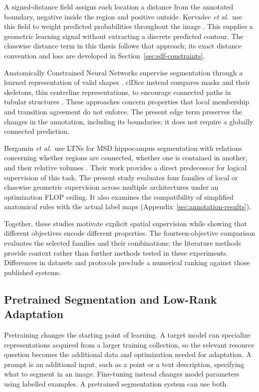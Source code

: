 \documentclass[12pt,a4paper]{article}
\begin{document}
A signed-distance field assigns each location a distance from the annotated
boundary, negative inside the region and positive outside. Kervadec \emph{et
al.}\ use this field to weight predicted probabilities throughout the image
\cite{kervadec2019boundary}. This supplies a geometric learning signal
without extracting a discrete predicted contour. The classwise distance term
in this thesis follows that approach; its exact distance convention and loss
are developed in Section~\ref{sec:sdf-constraints}.

Anatomically Constrained Neural Networks supervise segmentation through a
learned representation of valid shapes \cite{oktay2017anatomically}. clDice
instead compares masks and their skeletons, thin centreline representations,
to encourage connected paths in tubular structures \cite{shit2021cldice}.
These approaches concern properties that local membership and transition
agreement do not enforce. The present edge term preserves the changes in the
annotation, including its boundaries; it does not require a globally
connected prediction.

Bergamin \emph{et al.}\ use LTNs for MSD hippocampus segmentation with
relations concerning whether regions are connected, whether one is contained
in another, and their relative volumes \cite{bergamin2025integrating}. Their
work provides a direct predecessor for logical supervision of this task. The
present study evaluates four families of local or classwise geometric
supervision across multiple architectures under an optimization FLOP
ceiling. It also examines the compatibility of simplified anatomical rules
with the actual label maps (Appendix~\ref{sec:annotation-results}).

Together, these studies motivate explicit spatial supervision while showing
that different objectives encode different properties. The
fourteen-objective comparison evaluates the selected families and their
combinations; the literature methods provide context rather than further
methods tested in these experiments. Differences in datasets and protocols
preclude a numerical ranking against those published systems.

\subsection{Pretrained Segmentation and Low-Rank Adaptation}
\label{sec:pretrained-adaptation}

Pretraining changes the starting point of learning. A target model can
specialize representations acquired from a larger training collection, so
the relevant resource question becomes the additional data and optimization
needed for adaptation. A prompt is an additional input, such as a point or a
text description, specifying what to segment in an image. Fine-tuning
instead changes model parameters using labelled examples. A pretrained
segmentation system can use both.
\end{document}
